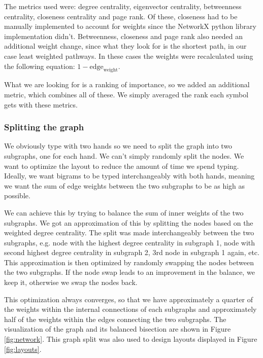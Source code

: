 \documentclass[9pt,twocolumn,twoside]{pnas-report}
\begin{document}
{The metrics used were: degree centrality, eigenvector centrality, betweenness centrality, closeness centrality and page rank.
Of these, closeness had to be manually implemented to account for weights since the NetworkX python library implementation didn't.
Betweenness, closeness and page rank also needed an additional weight change, since what they look for is the shortest path, in our case least weighted pathways.
In these cases the weights were recalculated using the following equation: $1 - \text{edge}_\text{weight}$.

What we are looking for is a ranking of importance, so we added an additional metric, which combines all of these.
We simply averaged the rank each symbol gets with these metrics.

\subsubsection*{Splitting the graph}

We obviously type with two hands so we need to split the graph into two subgraphs, one for each hand.
We can't simply randomly split the nodes.
We want to optimize the layout to reduce the amount of time we spend typing.
Ideally, we want bigrams to be typed interchangeably with both hands, meaning we want the sum of edge weights between the two subgraphs to be as high as possible.

We can achieve this by trying to balance the sum of inner weights of the two subgraphs.
We got an approximation of this by splitting the nodes based on the weighted degree centrality.
The split was made interchangeably between the two subgraphs, e.g. node with the highest degree centrality in subgraph 1, node with second highest degree centrality in subgraph 2, 3rd node in subgraph 1 again, etc.
This approximation is then optimized by randomly swapping the nodes between the two subgraphs.
If the node swap leads to an improvement in the balance, we keep it, otherwise we swap the nodes back.

This optimization always converges, so that we have approximately a quarter of the weights within the internal connections of each subgraphs and approximately half of the weights within the edges connecting the two subgraphs.
The visualization of the graph and its balanced bisection are shown in Figure \ref{fig:network}.
This graph split was also used to design layouts displayed in Figure \ref{fig:layouts}.

}
\end{document}
